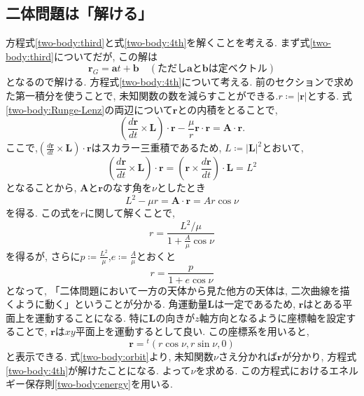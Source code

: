 \documentclass{ltjsarticle}
\theoremstyle{definition}
\numberwithin{thm}{section}
\theoremstyle{definition}
\numberwithin{prop}{section}
\theoremstyle{definition}
\numberwithin{dfn}{section}
\numberwithin{equation}{section}
\begin{document}
\subsection{二体問題は「解ける」}
方程式\ref{two-body:third}と式\ref{two-body:4th}を解くことを考える.
まず式\ref{two-body:third}についてだが, この解は
\begin{equation}
    \bm{r}_G=\bm{a}t+\bm{b}\quad(\text{ただし$\bm{a}$と$\bm{b}$は定ベクトル})
\end{equation}
となるので解ける.
方程式\ref{two-body:4th}について考える. 前のセクションで求めた第一積分を使うことで, 未知関数の数を減らすことができる.$r\coloneq |\bm{r}|$とする. 式\ref{two-body:Runge-Lenz}の両辺について$\bm{r}$との内積をとることで,
\begin{equation*}
    \left(\frac{d\bm{r}}{dt}\times\bm{L}\right)\cdot\bm{r}-\frac{\mu}{r}\bm{r}\cdot\bm{r}=\bm{A}\cdot\bm{r}.
\end{equation*}
ここで,$(\frac{d\bm{r}}{dt}\times\bm{L})\cdot\bm{r}$はスカラー三重積であるため, $L\coloneq |\bm{L}|^2$とおいて,
\begin{equation*}
    \left(\frac{d\bm{r}}{dt}\times\bm{L}\right)\cdot\bm{r}=\left(\bm{r}\times\frac{d\bm{r}}{dt}\right)\cdot \bm{L}=L^2
\end{equation*}
となることから, $\bm{A}$と$\bm{r}$のなす角を$\nu$としたとき
\begin{equation*}
    L^2-\mu r=\bm{A}\cdot\bm{r}=Ar\cos{\nu}
\end{equation*}
を得る. この式を$r$に関して解くことで,
\begin{equation*}
    r=\frac{L^2/\mu}{1+\frac{A}{\mu}\cos{\nu}}
\end{equation*}
を得るが, さらに$p\coloneq \frac{L^2}{\mu}$,$e\coloneq \frac{A}{\mu}$とおくと
\begin{equation}
    r=\frac{p}{1+e\cos{\nu}} \label{two-body:orbit}
\end{equation}
となって, 「二体問題において一方の天体から見た他方の天体は, 二次曲線を描くように動く」ということが分かる.
角運動量$\bm{L}$は一定であるため, $\bm{r}$はとある平面上を運動することになる. 特に$\bm{L}$の向きが$z$軸方向となるように座標軸を設定することで, $\bm{r}$は$xy$平面上を運動するとして良い. この座標系を用いると,
\begin{equation*}
    \bm{r}={}^t(r\cos{\nu},r\sin{\nu},0)
\end{equation*}
と表示できる. 式\ref{two-body:orbit}より, 未知関数$\nu$さえ分かれば$\bm{r}$が分かり, 方程式\ref{two-body:4th}が解けたことになる. よって$\nu$を求める. この方程式におけるエネルギー保存則\ref{two-body:energy}を用いる.
\end{document}
